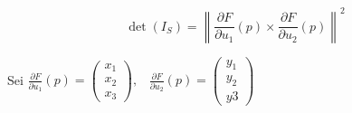 \begin{bemerkung}
    \[\det(I_S) = \left \| \frac{\partial F}{\partial u_1}(p) \times \frac{\partial F}{\partial u_2}(p) \right \|^2\]
\end{bemerkung}

\begin{beweis}\leavevmode
    Sei $\frac{\partial F}{\partial u_1}(p) = \begin{pmatrix}
        x_1\\ x_2 \\ x_3
    \end{pmatrix}, \;\;\; \frac{\partial F}{\partial u_2}(p) = \begin{pmatrix}
        y_1\\ y_2 \\ y3
    \end{pmatrix}$


\end{beweis}
